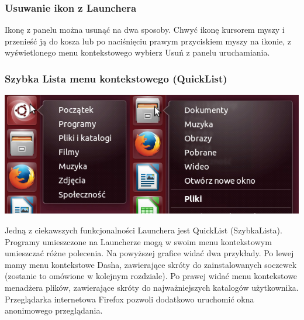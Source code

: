 \subsubsection{Usuwanie ikon z Launchera}
Ikonę z panelu można usunąć na dwa sposoby. Chwyć ikonę kursorem myszy i przenieść ją do kosza lub po naciśnięciu prawym przyciskiem myszy na ikonie, z wyświetlonego menu kontekstowego wybierz \textcolor{ubuntu_orange}{Usuń z panelu uruchamiania}.

\subsubsection{Szybka Lista menu kontekstowego (QuickList)}
\begin{center}
	\includegraphics[width=\linewidth]{images/unity_launcher_quicklist.png}
\end{center}

Jedną z ciekawszych funkcjonalności Launchera jest QuickList (SzybkaLista). Programy umieszczone na Launcherze mogą w swoim menu kontekstowym umieszczać różne polecenia. Na powyższej grafice widać dwa przykłady. Po lewej mamy menu kontekstowe Dasha, zawierające skróty do zainstalowanych soczewek (zostanie to omówione w kolejnym rozdziale). Po prawej widać menu kontekstowe menadżera plików, zawierające skróty do najważniejszych katalogów użytkownika. Przeglądarka internetowa Firefox pozwoli dodatkowo uruchomić okna anonimowego przeglądania.
\clearpage